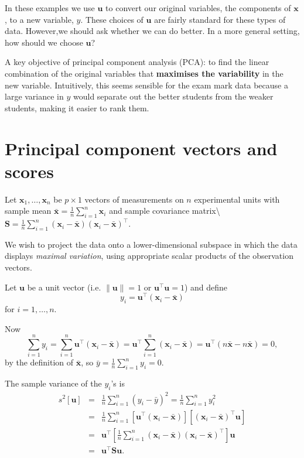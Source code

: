 \documentclass[]{book}
\theoremstyle{definition}
\theoremstyle{definition}
\theoremstyle{definition}
\theoremstyle{remark}
\begin{document}
In these examples we use \(\boldsymbol u\) to convert our original variables, the components of \(\boldsymbol x\), to a new variable, \(y\). These choices of \(\boldsymbol u\) are fairly standard for these types of data. However,we should ask whether we can do better. In a more general setting, how should we choose \(\boldsymbol u\)?

A key objective of principal component analysis (PCA): to find the linear combination of the original variables that \textbf{maximises the variability} in the new variable. Intuitively, this seems sensible for the exam mark data because a large variance in \(y\) would separate out the better students from the weaker students, making it easier to rank them.

\hypertarget{principal-component-vectors-and-scores}{%
\section{Principal component vectors and scores}\label{principal-component-vectors-and-scores}}

Let \(\boldsymbol x_1,\ldots,\boldsymbol x_n\) be \(p \times 1\) vectors of measurements on \(n\) experimental units with sample mean \(\bar{\boldsymbol x} = \frac{1}{n} \sum_{i=1}^n \boldsymbol x_i\) and sample covariance matrix\textbackslash{}
\(\boldsymbol S= \frac{1}{n} \sum_{i=1}^n (\boldsymbol x_i - \bar{\boldsymbol x}) (\boldsymbol x_i - \bar{\boldsymbol x})^\top\).

We wish to project the data onto a lower-dimensional subspace in which the data
displays \emph{maximal variation}, using appropriate scalar products of the observation
vectors.

Let \(\boldsymbol u\) be a unit vector (i.e. \(\| \boldsymbol u\| = 1\) or \(\boldsymbol u^\top \boldsymbol u=1\)) and define
\[y_i= \boldsymbol u^\top (\boldsymbol x_i - \bar{\boldsymbol x})\]
for \(i=1,\ldots,n\).

Now
\[ \sum_{i=1}^n y_i = \sum_{i=1}^n \boldsymbol u^\top (\boldsymbol x_i - \bar{\boldsymbol x})
= \boldsymbol u^\top \sum_{i=1}^n (\boldsymbol x_i - \bar{\boldsymbol x})
= \boldsymbol u^\top (n \bar{\boldsymbol x} - n \bar{\boldsymbol x}) = 0,\]
by the definition of \(\bar{\boldsymbol x}\), so \(\bar{y} = \frac{1}{n} \sum_{i=1}^n y_i = 0\).

The sample variance of the \(y_i\)'s is
\begin{eqnarray*}
s^2[\boldsymbol u] &=& \frac{1}{n} \sum_{i=1}^n (y_i - \bar{y})^2 = \frac{1}{n} \sum_{i=1}^n y_i^2 \\
&=& \frac{1}{n} \sum_{i=1}^n \left[\boldsymbol u^\top (\boldsymbol x_i - \bar{\boldsymbol x}) \right]\left[(\boldsymbol x_i - \bar{\boldsymbol x})^\top \boldsymbol u\right]\\
&=& \boldsymbol u^\top \left[\frac{1}{n} \sum_{i=1}^n (\boldsymbol x_i - \bar{\boldsymbol x})(\boldsymbol x_i - \bar{\boldsymbol x})^\top \right]\boldsymbol u\\
&=& \boldsymbol u^\top \boldsymbol S\boldsymbol u.
\end{eqnarray*}
\end{document}
